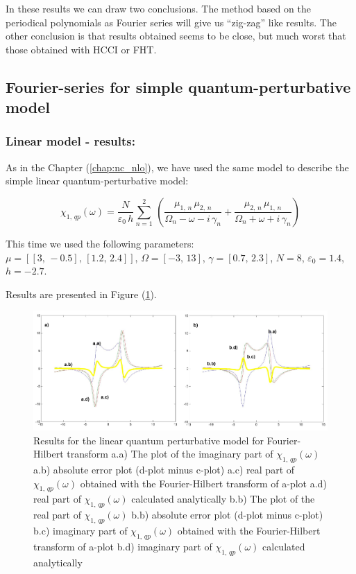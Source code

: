 \documentclass[12pt,twoside,a4paper]{article}
\numberwithin{equation}{subsection}
\numberwithin{figure}{subsection}
\begin{document}
In these results we can draw two conclusions. The method based on the periodical polynomials as Fourier series will
give us ``zig-zag'' like results. The other conclusion is that results obtained seems to be close, but much worst that those
obtained with HCCI or FHT. 

\subsection{Fourier-series for simple quantum-perturbative model} \label{chap:fourier_quantum}

\subsubsection*{Linear model - results:}

As in the Chapter (\ref{chap:nc_nlo}), we have used the same model to describe the simple linear quantum-perturbative model: 

\begin{equation} \label{eq:four_qp}
  {\chi_{1, \,qp}}(\omega ) = \frac {N}{\varepsilon_0\,h} \sum_{n=1}^{2}\,(\frac {{\mu_{1, \,n}}\,{ \mu_{2, \,n}}}{{\Omega_{n}}
  - \omega  - i\,{\gamma_{n}}} + \frac {{\mu_{2, \,n}}\,{\mu_{1, \,n}}}{{\Omega_{n}} + \omega + i\,{\gamma_{n}}})
\end{equation}

This time we used the following parameters: \\
$\mu = [[3, \, - 0.5], \,[1.2, \,2.4]]$, 
$\Omega =[ - 3, \,13]$, 
$\gamma =[0.7, \,2.3]$,  
$N=8$, 
${\varepsilon_{0}}=1.4$, 
$h= - 2.7$.

Results are presented in Figure (\ref{fig:four_qp1}). 

\begin{figure}
  \includegraphics[width=150mm]{img/four_qp1.png}
  \caption{Results for the linear quantum perturbative model for Fourier-Hilbert transform
    a.a) The plot of the imaginary part of ${\chi_{1, \, qp}}(\omega )$
    a.b) absolute error plot (d-plot minus c-plot) 
    a.c) real part of ${\chi_{1, \, qp}}(\omega )$ obtained with the Fourier-Hilbert transform of a-plot 
    a.d) real part of ${\chi_{1, \, qp}}(\omega )$ calculated analytically 
    b.b) The plot of the real part of ${\chi_{1, \, qp}}(\omega )$ 
    b.b) absolute error plot (d-plot minus c-plot) 
    b.c) imaginary part of ${\chi_{1, \, qp}}(\omega )$ obtained with the Fourier-Hilbert transform of a-plot 
    b.d) imaginary part of ${\chi_{1, \, qp}}(\omega )$ calculated analytically  
    \label{fig:four_qp1}
  }
\end{figure}
\end{document}
